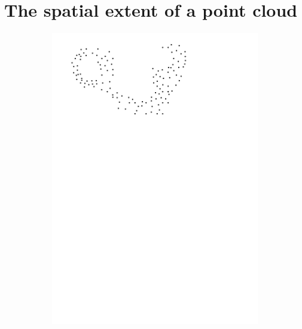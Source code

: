 
\graphicspath{{spatialextent/}}

\chapter{The spatial extent of a point cloud}
\label{chap:spatialextent}


\begin{figure}[h]
  \centering
  \begin{subfigure}[b]{0.22\linewidth}
    \centering
    \includegraphics[page=1,width=\textwidth]{figs/idea.pdf}
  \end{subfigure}%
  \quad
  \begin{subfigure}[b]{0.22\linewidth}
    \centering

\end{subfigure}
\end{figure}

